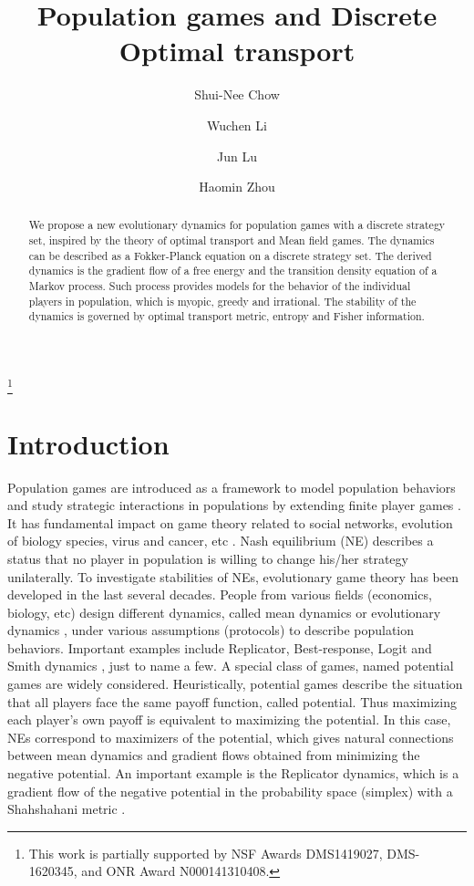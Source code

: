 \documentclass[11pt,reqno]{amsart}
\begin{document}
\title[Evolutionary dynamics via Optimal transport]{Population games and Discrete Optimal transport}
\author[Chow]{Shui-Nee Chow}
\author[Li]{Wuchen Li}
\author[Lu]{Jun Lu}
\author[Zhou]{Haomin Zhou}
\thanks{This work is partially supported by NSF 
Awards DMS\textendash{}1419027,  DMS-1620345, 
and ONR Award N000141310408.}
\maketitle
\begin{abstract}
 We propose a new evolutionary dynamics for population games with a discrete strategy set, inspired by the theory of optimal transport and Mean field games. The dynamics can be described as a Fokker-Planck equation on a discrete strategy set. The derived dynamics is the gradient flow of a free energy and the transition density equation of a Markov process. Such process provides models for the behavior of the individual players in population, which is myopic, greedy and irrational. The stability of the dynamics is governed by optimal transport metric, entropy and Fisher information. 
\end{abstract}

\section{Introduction}
Population games are introduced as a framework to model population behaviors and study strategic interactions in populations by extending finite player games \cite{nash1950equilibrium, sigmund1999evolutionary, von2007theory}. It has fundamental impact on game theory related to social networks, evolution of biology species, virus and cancer, etc \cite{social, learning, shah2010dynamics,cancer}. Nash equilibrium (NE) describes a status that no player in population is willing to change his/her strategy unilaterally. To investigate stabilities of NEs, evolutionary game theory \cite{nowak2006evolutionary, san2012,  sigmund1999evolutionary} has been developed in the last several decades. People from various fields (economics, biology, etc) design different dynamics, called mean dynamics or evolutionary dynamics \cite{hofbauer2003, san2009},  under various assumptions (protocols) to describe population behaviors. Important examples include Replicator, Best-response, Logit and Smith dynamics \cite{matsui1992best, shah2010dynamics, smith1984}, just to name a few. A special class of games, named potential games \cite{hofbauer1988theory, monderer1996potential,san2010} are widely considered. Heuristically, potential games describe the situation that all players face the same payoff function, called potential. Thus maximizing each player's own payoff is equivalent to maximizing the potential. In this case, NEs correspond to maximizers of the potential, which gives natural connections between mean dynamics and gradient flows obtained from minimizing the negative potential. An important example is the Replicator dynamics, which is a gradient flow of the negative potential in the probability space (simplex) with a Shahshahani metric \cite{akin1979geometry, RM, Shahshahani}.
 
\end{document}
